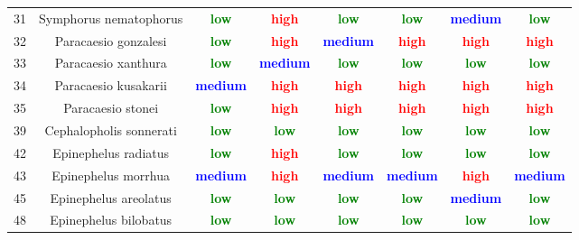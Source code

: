 \documentclass{report}\usepackage[]{graphicx}\usepackage[]{color}
\begin{document}
\begin{table}[ht]
{\begin{tabular}{cccccccc}
   31 & Symphorus nematophorus & \textcolor{green}{\textbf{low}} & \textcolor{red}{\textbf{high}} & \textcolor{green}{\textbf{low}} & \textcolor{green}{\textbf{low}} & \textcolor{blue}{\textbf{medium}} & \textcolor{green}{\textbf{low}} \\ 
   32 & Paracaesio gonzalesi & \textcolor{green}{\textbf{low}} & \textcolor{red}{\textbf{high}} & \textcolor{blue}{\textbf{medium}} & \textcolor{red}{\textbf{high}} & \textcolor{red}{\textbf{high}} & \textcolor{red}{\textbf{high}} \\ 
   33 & Paracaesio xanthura & \textcolor{green}{\textbf{low}} & \textcolor{blue}{\textbf{medium}} & \textcolor{green}{\textbf{low}} & \textcolor{green}{\textbf{low}} & \textcolor{green}{\textbf{low}} & \textcolor{green}{\textbf{low}} \\ 
   34 & Paracaesio kusakarii & \textcolor{blue}{\textbf{medium}} & \textcolor{red}{\textbf{high}} & \textcolor{red}{\textbf{high}} & \textcolor{red}{\textbf{high}} & \textcolor{red}{\textbf{high}} & \textcolor{red}{\textbf{high}} \\ 
   35 & Paracaesio stonei & \textcolor{green}{\textbf{low}} & \textcolor{red}{\textbf{high}} & \textcolor{red}{\textbf{high}} & \textcolor{red}{\textbf{high}} & \textcolor{red}{\textbf{high}} & \textcolor{red}{\textbf{high}} \\ 
   39 & Cephalopholis sonnerati & \textcolor{green}{\textbf{low}} & \textcolor{green}{\textbf{low}} & \textcolor{green}{\textbf{low}} & \textcolor{green}{\textbf{low}} & \textcolor{green}{\textbf{low}} & \textcolor{green}{\textbf{low}} \\ 
   42 & Epinephelus radiatus & \textcolor{green}{\textbf{low}} & \textcolor{red}{\textbf{high}} & \textcolor{green}{\textbf{low}} & \textcolor{green}{\textbf{low}} & \textcolor{green}{\textbf{low}} & \textcolor{green}{\textbf{low}} \\ 
   43 & Epinephelus morrhua & \textcolor{blue}{\textbf{medium}} & \textcolor{red}{\textbf{high}} & \textcolor{blue}{\textbf{medium}} & \textcolor{blue}{\textbf{medium}} & \textcolor{red}{\textbf{high}} & \textcolor{blue}{\textbf{medium}} \\ 
   45 & Epinephelus areolatus & \textcolor{green}{\textbf{low}} & \textcolor{green}{\textbf{low}} & \textcolor{green}{\textbf{low}} & \textcolor{green}{\textbf{low}} & \textcolor{blue}{\textbf{medium}} & \textcolor{green}{\textbf{low}} \\ 
   48 & Epinephelus bilobatus & \textcolor{green}{\textbf{low}} & \textcolor{green}{\textbf{low}} & \textcolor{green}{\textbf{low}} & \textcolor{green}{\textbf{low}} & \textcolor{green}{\textbf{low}} & \textcolor{green}{\textbf{low}} \\ 

\end{tabular}}
\end{table}
\end{document}
